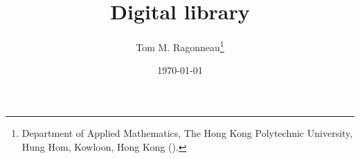 \documentclass{article}
\title{Digital library}
\author{Tom M. Ragonneau\thanks{
    Department of Applied Mathematics,
    The Hong Kong Polytechnic University,
    Hung Hom, Kowloon, Hong Kong
    (\email{tom.ragonneau@polyu.edu.hk}).
}}
\date{\today}
\begin{document}
\maketitle

\nocite{*}


\end{document}
